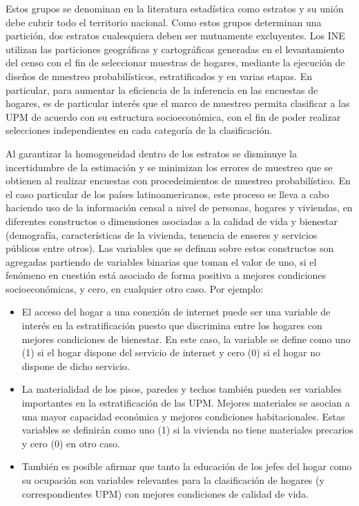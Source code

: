 \documentclass[
  12pt,
]{book}
\providecommand{\tightlist}{%
  \setlength{\itemsep}{0pt}\setlength{\parskip}{0pt}}
\begin{document}
Estos grupos se denominan en la literatura estadística como estratos y su unión debe cubrir todo el territorio nacional. Como estos grupos determinan una partición, dos estratos cualesquiera deben ser mutuamente excluyentes. Los INE utilizan las particiones geográficas y cartográficas generadas en el levantamiento del censo con el fin de seleccionar muestras de hogares, mediante la ejecución de diseños de muestreo probabilísticos, estratificados y en varias etapas. En particular, para aumentar la eficiencia de la inferencia en las encuestas de hogares, es de particular interés que el marco de muestreo permita clasificar a las UPM de acuerdo con su estructura socioeconómica, con el fin de poder realizar selecciones independientes en cada categoría de la clasificación.

Al garantizar la homogeneidad dentro de los estratos se disminuye la incertidumbre de la estimación y se minimizan los errores de muestreo que se obtienen al realizar encuestas con procedeimientos de muestreo probabilístico. En el caso particular de los países latinoamericanos, este proceso se lleva a cabo haciendo uso de la información censal a nivel de personas, hogares y viviendas, en diferentes constructos o dimensiones asociadas a la calidad de vida y bienestar (demografía, características de la vivienda, tenencia de enseres y servicios públicos entre otros). Las variables que se definan sobre estos constructos son agregadas partiendo de variables binarias que toman el valor de uno, si el fenómeno en cuestión está asociado de forma positiva a mejores condiciones socioeconómicas, y cero, en cualquier otro caso. Por ejemplo:

\begin{itemize}
\tightlist
\item
  El acceso del hogar a una conexión de internet puede ser una variable de interés en la estratificación puesto que discrimina entre los hogares con mejores condiciones de bienestar. En este caso, la variable se define como uno (1) si el hogar dispone del servicio de internet y cero (0) si el hogar no dispone de dicho servicio.
\item
  La materialidad de los pisos, paredes y techos también pueden ser variables importantes en la estratificación de las UPM. Mejores materiales se asocian a una mayor capacidad económica y mejores condiciones habitacionales. Estas variables se definirán como uno (1) si la vivienda no tiene materiales precarios y cero (0) en otro caso.
\item
  También es posible afirmar que tanto la educación de los jefes del hogar como su ocupación son variables relevantes para la clasificación de hogares (y correspondientes UPM) con mejores condiciones de calidad de vida.
\end{itemize}
\end{document}
